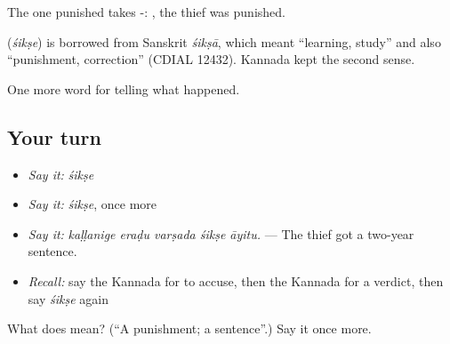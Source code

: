 The one punished takes -:   , the thief was punished.

\begin{cousinweb}
\textbf{} (\emph{śikṣe}) is borrowed from Sanskrit \emph{śikṣā}, which meant \textquotedblleft{}learning, study\textquotedblright{} and also \textquotedblleft{}punishment, correction\textquotedblright{} (CDIAL 12432). Kannada kept the second sense.
\end{cousinweb}

\begin{grammarlens}[title={What you've built}]
One more word for telling what happened.
\end{grammarlens}

\subsection*{Your turn}
\begin{itemize}
\raggedright
  \item \emph{Say it:} \emph{śikṣe}
  \item \emph{Say it:} \emph{śikṣe}, once more
  \item \emph{Say it:} \emph{kaḷḷanige eraḍu varṣada śikṣe āyitu.} — The thief got a two-year sentence.
  \item \emph{Recall:} say the Kannada for to accuse, then the Kannada for a verdict, then say \emph{śikṣe} again
\end{itemize}

\begin{tcolorbox}[breakable,colback=teal!4,colframe=teal!35!black,title={Before you move on}]
What does  mean? (\textquotedblleft{}A punishment; a sentence\textquotedblright{}.) Say it once more.
\end{tcolorbox}
